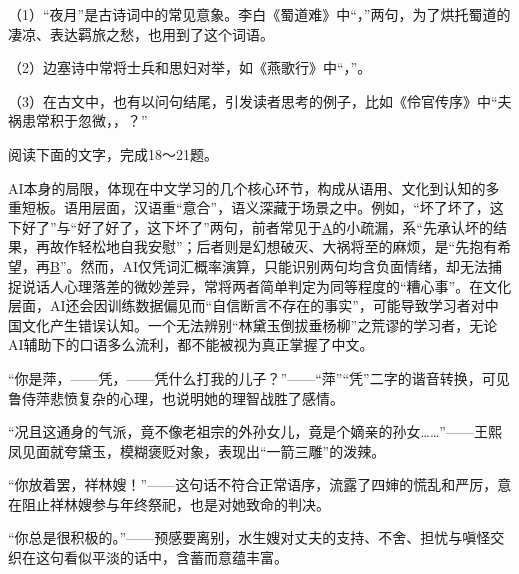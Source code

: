 \documentclass[11pt,a4paper]{ctexart}
\begin{document}

\par\vspace{2.2em}



（1）“夜月”是古诗词中的常见意象。李白《蜀道难》中“\blank[6.5em]，\blank[6.5em]”两句，为了烘托蜀道的凄凉、表达羁旅之愁，也用到了这个词语。

（2）边塞诗中常将士兵和思妇对举，如《燕歌行》中“\blank[6.5em]，\blank[6.5em]”。

（3）在古文中，也有以问句结尾，引发读者思考的例子，比如《伶官传序》中“夫祸患常积于忽微，\blank[6.5em]，\blank[6.5em]？”

阅读下面的文字，完成18～21题。

{\ywkai AI本身的局限，体现在中文学习的几个核心环节，构成从语用、文化到认知的多重短板。语用层面，汉语重“意合”，语义深藏于场景之中。例如，“坏了坏了，这下好了”与“好了好了，这下坏了”两句，前者常见于\underline{\hspace{0.6em}A\hspace{0.6em}}的小疏漏，系“先承认坏的结果，再故作轻松地自我安慰”；后者则是幻想破灭、大祸将至的麻烦，是“先抱有希望，再\underline{\hspace{0.6em}B\hspace{0.6em}}”。然而，AI仅凭词汇概率演算，只能识别两句均含负面情绪，却无法捕捉说话人心理落差的微妙差异，常将两者简单判定为同等程度的“糟心事”。在文化层面，AI还会因训练数据偏见而“自信断言不存在的事实”，可能导致学习者对中国文化产生错误认知。一个无法辨别“林黛玉倒拔垂杨柳”之荒谬的学习者，无论AI辅助下的口语多么流利，都不能被视为真正掌握了中文。\par}

\begin{choices}
\item “你是萍，——凭，——凭什么打我的儿子？”——“萍”“凭”二字的谐音转换，可见鲁侍萍悲愤复杂的心理，也说明她的理智战胜了感情。
\item “况且这通身的气派，竟不像老祖宗的外孙女儿，竟是个嫡亲的孙女……”——王熙凤见面就夸黛玉，模糊褒贬对象，表现出“一箭三雕”的泼辣。
\item “你放着罢，祥林嫂！”——这句话不符合正常语序，流露了四婶的慌乱和严厉，意在阻止祥林嫂参与年终祭祀，也是对她致命的判决。
\item “你总是很积极的。”——预感要离别，水生嫂对丈夫的支持、不舍、担忧与嗔怪交织在这句看似平淡的话中，含蓄而意蕴丰富。
\end{choices}
\end{document}
